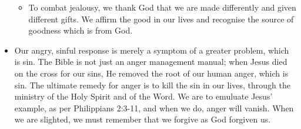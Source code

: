 \begin{itemize}
{\begin{itemize}
{\begin{itemize}
      \item{To combat jealousy, we thank God that we are made differently and
        given different gifts.  We affirm the good in our lives and recognise
        the source of goodness which is from God.}
    \end{itemize}}
  \end{itemize}}
  \item{Our angry, sinful response is merely a symptom of a greater problem,
  which is sin.  The Bible is not just an anger management manual; when Jesus
  died on the cross for our sins, He removed the root of our human anger,
  which is sin.  The ultimate remedy for anger is to kill the sin in our
  lives, through the ministry of the Holy Spirit and of the Word.  We are to
  emuluate Jesus' example, as per Philippians 2:3-11, and when we do, anger
  will vanish.  When we are slighted, we must remember that we forgive as God
  forgiven us.}
\end{itemize}